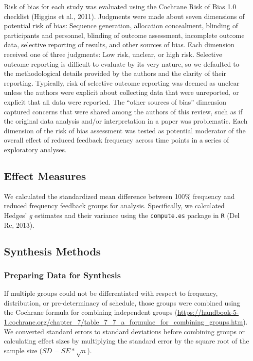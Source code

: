 \documentclass[
  english,
  man,mask,floatsintext]{apa7}
\begin{document}
Risk of bias for each study was evaluated using the Cochrane Risk of Bias 1.0 checklist (Higgins et al., 2011). Judgments were made about seven dimensions of potential risk of bias: Sequence generation, allocation concealment, blinding of participants and personnel, blinding of outcome assessment, incomplete outcome data, selective reporting of results, and other sources of bias. Each dimension received one of three judgments: Low risk, unclear, or high risk. Selective outcome reporting is difficult to evaluate by its very nature, so we defaulted to the methodological details provided by the authors and the clarity of their reporting. Typically, risk of selective outcome reporting was deemed as unclear unless the authors were explicit about collecting data that were unreported, or explicit that all data were reported. The ``other sources of bias'' dimension captured concerns that were shared among the authors of this review, such as if the original data analysis and/or interpretation in a paper was problematic. Each dimension of the risk of bias assessment was tested as potential moderator of the overall effect of reduced feedback frequency across time points in a series of exploratory analyses.

\hypertarget{effect-measures}{%
\subsection{Effect Measures}\label{effect-measures}}

We calculated the standardized mean difference between 100\% frequency and reduced frequency feedback groups for analysis. Specifically, we calculated Hedges' \emph{g} estimates and their variance using the \texttt{compute.es} package in \texttt{R} (Del Re, 2013).

\hypertarget{synthesis-methods}{%
\subsection{Synthesis Methods}\label{synthesis-methods}}

\hypertarget{preparing-data-for-synthesis}{%
\subsubsection{Preparing Data for Synthesis}\label{preparing-data-for-synthesis}}

If multiple groups could not be differentiated with respect to frequency, distribution, or pre-determinacy of schedule, those groups were combined using the Cochrane formula for combining independent groups (\url{https://handbook-5-1.cochrane.org/chapter_7/table_7_7_a_formulae_for_combining_groups.htm}). We converted standard errors to standard deviations before combining groups or calculating effect sizes by multiplying the standard error by the square root of the sample size (\(SD = SE*\sqrt{n}\)).
\end{document}
